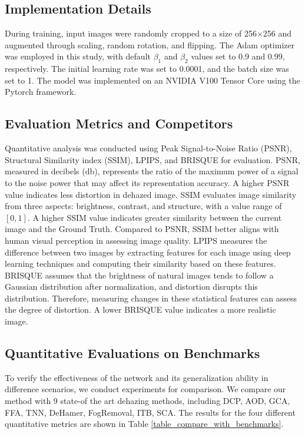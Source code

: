 \documentclass[lettersize,journal]{IEEEtran}
\begin{document}
\subsection{Implementation Details}


During training, input images were randomly cropped to a size of 256×256 and augmented through scaling, random rotation, and flipping. The Adam optimizer\cite{kingma2014adam} was employed in this study, with default $\beta_{1}$ and $\beta_{2}$ values set to 0.9 and 0.99, respectively. The initial learning rate was set to 0.0001, and the batch size was set to 1. The model was implemented on an NVIDIA V100 Tensor Core using the Pytorch framework.

\subsection{Evaluation Metrics and Competitors}

 Quantitative analysis was conducted using Peak Signal-to-Noise Ratio (PSNR), Structural Similarity index (SSIM)\cite{wang2004image}, LPIPS\cite{zhang2018unreasonable}, and BRISQUE\cite{mittal2012no} for evaluation. PSNR, measured in decibels (db), represents the ratio of the maximum power of a signal to the noise power that may affect its representation accuracy. A higher PSNR value indicates less distortion in dehazed image. SSIM evaluates image similarity from three aspects: brightness, contrast, and structure, with a value range of $[0,1]$. A higher SSIM value indicates greater similarity between the current image and the Ground Truth. Compared to PSNR, SSIM better aligns with human visual perception in assessing image quality. LPIPS measures the difference between two images by extracting features for each image using deep learning techniques and computing their similarity based on these features. BRISQUE assumes that the brightness of natural images tends to follow a Gaussian distribution after normalization, and distortion disrupts this distribution. Therefore, measuring changes in these statistical features can assess the degree of distortion. A lower BRISQUE value indicates a more realistic image.
 
\subsection{Quantitative Evaluations on Benchmarks}
To verify the effectiveness of the network and its generalization ability in difference scenarios, we conduct experiments for comparison. We compare our method with 9 state-of the art dehazing methods, including DCP\cite{he2010single}, AOD\cite{li2017aod}, GCA\cite{chen2019gated}, FFA\cite{qin2020ffa}, TNN\cite{yu2021two}, DeHamer\cite{guo2022image}, FogRemoval\cite{jin2022structure}, ITB\cite{liu2023data}, SCA\cite{guo2023scanet}. The results for the four different quantitative metrics are shown in Table \ref{table_compare_with_benchmarks}.
\end{document}
